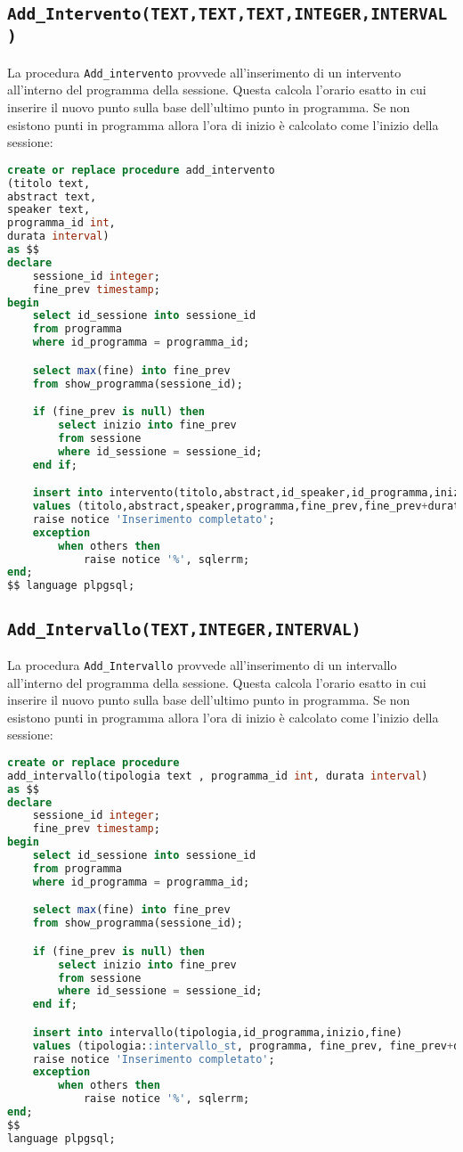 \subsection{\texttt{Add\_Intervento(TEXT,TEXT,TEXT,INTEGER,INTERVAL)}}
La procedura \texttt{Add\_intervento} provvede all'inserimento di un intervento all'interno del programma della sessione. Questa calcola l'orario esatto in cui inserire il nuovo punto sulla base dell'ultimo punto in programma. Se non esistono punti in programma allora l'ora di inizio è calcolato come l'inizio della sessione:
\begin{lstlisting}[language=SQL,style=mystyle]
create or replace procedure add_intervento
(titolo text, 
abstract text, 
speaker text, 
programma_id int,
durata interval)
as $$
declare
    sessione_id integer;
    fine_prev timestamp;
begin
    select id_sessione into sessione_id
    from programma
    where id_programma = programma_id;

    select max(fine) into fine_prev
    from show_programma(sessione_id);

    if (fine_prev is null) then
        select inizio into fine_prev
        from sessione
        where id_sessione = sessione_id;
    end if;

    insert into intervento(titolo,abstract,id_speaker,id_programma,inizio,fine)
    values (titolo,abstract,speaker,programma,fine_prev,fine_prev+durata);
    raise notice 'Inserimento completato';
    exception
        when others then
            raise notice '%', sqlerrm;
end;
$$ language plpgsql;
\end{lstlisting}

\subsection{\texttt{Add\_Intervallo(TEXT,INTEGER,INTERVAL)}}
La procedura \texttt{Add\_Intervallo} provvede all'inserimento di un intervallo all'interno del programma della sessione. Questa calcola l'orario esatto in cui inserire il nuovo punto sulla base dell'ultimo punto in programma. Se non esistono punti in programma allora l'ora di inizio è calcolato come l'inizio della sessione:
\begin{lstlisting}[language=SQL,style=mystyle]
create or replace procedure 
add_intervallo(tipologia text , programma_id int, durata interval)
as $$
declare
    sessione_id integer;
    fine_prev timestamp;
begin
    select id_sessione into sessione_id
    from programma
    where id_programma = programma_id;

    select max(fine) into fine_prev
    from show_programma(sessione_id);

    if (fine_prev is null) then
        select inizio into fine_prev
        from sessione
        where id_sessione = sessione_id;
    end if;

    insert into intervallo(tipologia,id_programma,inizio,fine)
    values (tipologia::intervallo_st, programma, fine_prev, fine_prev+durata);
    raise notice 'Inserimento completato';
    exception
        when others then
            raise notice '%', sqlerrm;
end;
$$ 
language plpgsql;
\end{lstlisting}
